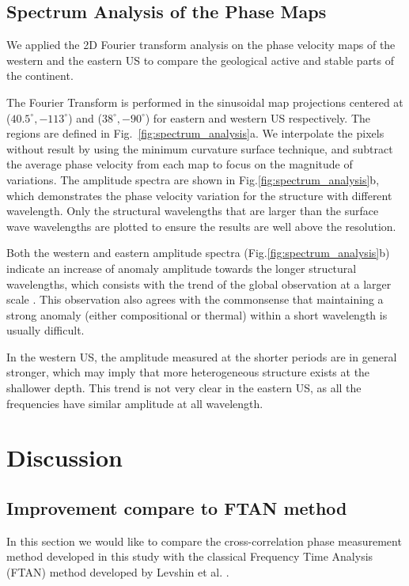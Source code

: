 \documentclass[referee]{gji}
\begin{document}
\subsection{Spectrum Analysis of the Phase Maps}

We applied the 2D Fourier transform analysis on the phase velocity maps of the western and the eastern US to compare the geological active and stable parts of the continent. 

The Fourier Transform is performed in the sinusoidal map projections centered at ($40.5^\circ,-113^\circ$) and ($38^\circ,-90^\circ$) for eastern and western US respectively. The regions are defined in Fig.~\ref{fig:spectrum_analysis}a. We interpolate the pixels without result by using the minimum curvature surface technique, and subtract the average phase velocity from each map to focus on the magnitude of variations. The amplitude spectra are shown in Fig.\ref{fig:spectrum_analysis}b, which demonstrates the phase velocity variation for the structure with different wavelength.
Only the structural wavelengths that are larger than the surface wave wavelengths are plotted to ensure the results are well above the resolution.

Both the western and eastern amplitude spectra (Fig.\ref{fig:spectrum_analysis}b) indicate an increase of anomaly amplitude towards the longer structural wavelengths, which consists with the trend of the global observation at a larger scale \cite{Dziewonski:2010ma}. This observation also agrees with the commonsense that maintaining a strong anomaly (either compositional or thermal) within a short wavelength is usually difficult. 

In the western US, the amplitude measured at the shorter periods are in general stronger, which may imply that more heterogeneous structure exists at the shallower depth. This trend is not very clear in the eastern US, as all the frequencies have similar amplitude at all wavelength. 

\section{Discussion}

\subsection{Improvement compare to FTAN method}

In this section we would like to compare the cross-correlation phase measurement method developed in this study with the classical Frequency Time Analysis (FTAN) method developed by Levshin et al. . 
\end{document}
